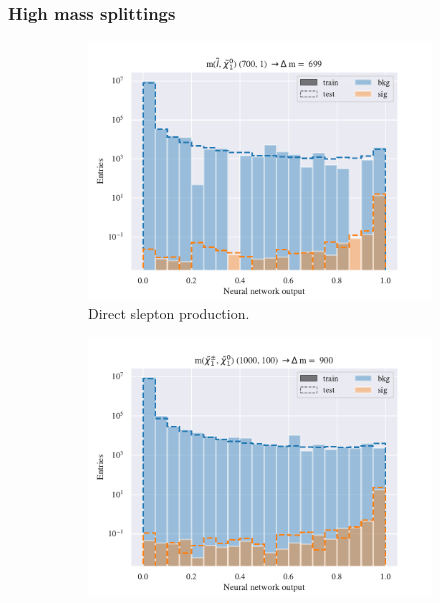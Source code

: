 \subsubsection{High mass splittings}







\begin{figure}[H]
    \centering
    \begin{subfigure}[t!]{0.49\textwidth}
        \includegraphics[width = \textwidth]{Figures/SlepSlep/ML/NN/Low_level/High/scaled_train_test_396033.pdf}
        \caption{Direct slepton production.}
        \label{fig:SlepslepNNLow}
    \end{subfigure}
    \begin{subfigure}[t!]{0.49\textwidth}
        \includegraphics[width = \textwidth]{Figures/SlepSnu/NN/Low_level/High/scaled_train_test_397169.pdf}

\end{subfigure}
\end{figure}
